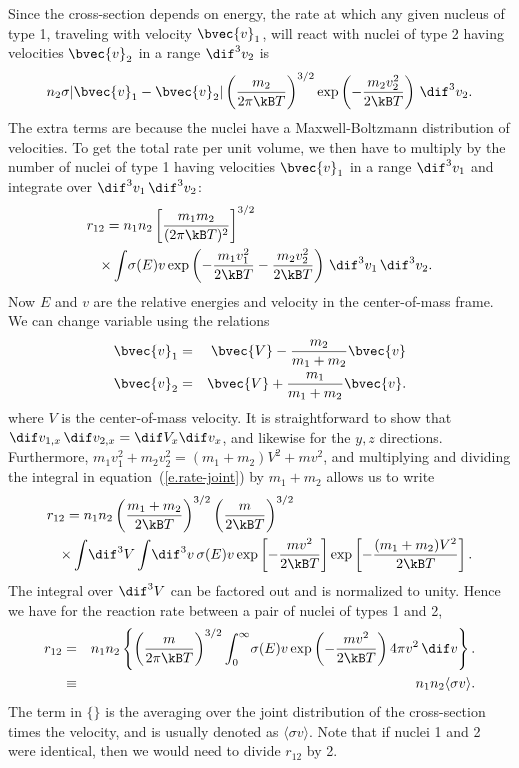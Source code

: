 \begin{sidebar}
\label{sb.thermally-averaged-cross-section}
Since the cross-section depends on energy, the rate at which any given nucleus of type 1, traveling with velocity $\bvec{v}_{1}$, will react with nuclei of type 2 having velocities $\bvec{v}_{2}$ in a range $\dif^{3}v_{2}$ is
\[ n_{2} \sigma |\bvec{v}_{1}-\bvec{v}_{2}| \left(\frac{m_{2}}{2\pi \kB T}\right)^{3/2}\exp\left(-\frac{m_{2}v_{2}^{2}}{2\kB T}\right) \,\dif^{3}v_{2}. \]
The extra terms are because the nuclei have a Maxwell-Boltzmann distribution of velocities. To get the total rate per unit volume, we then have to multiply by the number of nuclei of type 1 having velocities $\bvec{v}_{1}$ in a range $\dif^{3} v_{1}$ and integrate over $\dif^{3}v_{1}\,\dif^{3}v_{2}$:
\begin{eqnarray}\label{e.rate-joint}
\lefteqn{r_{12} = n_{1}n_{2}  \left[\frac{m_{1}m_{2}}{(2\pi \kB T)^{2}}\right]^{3/2}}
  \nonumber\\ &&\times\int\! \sigma(E) v\exp\left(-\frac{m_{1}v_{1}^{2}}{2\kB T}-\frac{m_{2}v_{2}^{2}}{2\kB T}\right)  \,\dif^{3} v_{1}\,\dif^{3}v_{2}.
\end{eqnarray}
Now $E$ and $v$ are the relative energies and velocity in the center-of-mass frame.  We can change variable using the relations
\begin{eqnarray*}
\bvec{v}_{1} &=& \bvec{V} - \frac{m_{2}}{m_{1}+m_{2}} \bvec{v}\\
\bvec{v}_{2} &=& \bvec{V} + \frac{m_{1}}{m_{1}+m_{2}} \bvec{v}.
\end{eqnarray*}
where $V$ is the center-of-mass velocity. It is straightforward to show that $\dif v_{1,x}\,\dif v_{2,x} = \dif V_{x}\dif v_{x}$, and likewise for the $y,z$ directions.  Furthermore, $m_{1}v_{1}^{2} + m_{2}v_{2}^{2} = (m_{1}+m_{2})V^{2} + m v^{2}$, and multiplying and dividing the integral in equation~(\ref{e.rate-joint}) by $m_{1}+m_{2}$ allows us to write
\begin{eqnarray*}
\lefteqn{r_{12} = n_{1}n_{2} \left(\frac{m_{1}+m_{2}}{2\kB T}\right)^{3/2}\left(\frac{m}{2\kB T}\right)^{3/2}}\\
&&\times \int\!\dif^{3}V \int\!\dif^{3}v \,\sigma(E)v \exp\left[-\frac{mv^{2}}{2\kB T}\right]
 \exp\left[-\frac{(m_{1}+m_{2})V^{2}}{2\kB T}\right].
\end{eqnarray*}
The integral over $\dif^{3}V$ can be factored out and is normalized to unity. Hence we have for the reaction rate between a pair of nuclei of types 1 and 2, 
\begin{eqnarray}\label{e.rate}
r_{12} &=& n_{1}n_{2}\left\{\left(\frac{m}{2\pi\kB T}\right)^{3/2}\int_{0}^{\infty}\! \sigma(E) v \exp\left(-\frac{mv^{2}}{2\kB T}\right)  4\pi v^{2}\,\dif v\right\}.\nonumber\\
 &\equiv& n_{1}n_{2}\langle\sigma v\rangle.
\end{eqnarray}
The term in $\{\}$ is the averaging over the joint distribution of the cross-section times the velocity, and is usually denoted as $\langle\sigma v\rangle$. Note that if nuclei 1 and 2 were identical, then we would need to divide $r_{12}$ by 2.


\end{sidebar}
